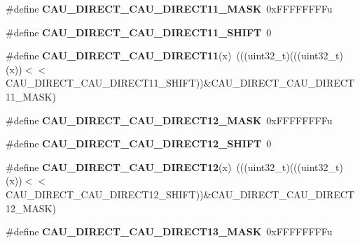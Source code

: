\begin{DoxyCompactItemize}
\item 
\#define {\bfseries C\+A\+U\+\_\+\+D\+I\+R\+E\+C\+T\+\_\+\+C\+A\+U\+\_\+\+D\+I\+R\+E\+C\+T11\+\_\+\+M\+A\+SK}~0x\+F\+F\+F\+F\+F\+F\+F\+Fu\hypertarget{group__CAU__Register__Masks_gaf2b9a81af0187f3bb946b6d0a371a05f}{}\label{group__CAU__Register__Masks_gaf2b9a81af0187f3bb946b6d0a371a05f}

\item 
\#define {\bfseries C\+A\+U\+\_\+\+D\+I\+R\+E\+C\+T\+\_\+\+C\+A\+U\+\_\+\+D\+I\+R\+E\+C\+T11\+\_\+\+S\+H\+I\+FT}~0\hypertarget{group__CAU__Register__Masks_ga5a79ec46736566014503f1858c92f19e}{}\label{group__CAU__Register__Masks_ga5a79ec46736566014503f1858c92f19e}

\item 
\#define {\bfseries C\+A\+U\+\_\+\+D\+I\+R\+E\+C\+T\+\_\+\+C\+A\+U\+\_\+\+D\+I\+R\+E\+C\+T11}(x)~(((uint32\+\_\+t)(((uint32\+\_\+t)(x))$<$$<$C\+A\+U\+\_\+\+D\+I\+R\+E\+C\+T\+\_\+\+C\+A\+U\+\_\+\+D\+I\+R\+E\+C\+T11\+\_\+\+S\+H\+I\+FT))\&C\+A\+U\+\_\+\+D\+I\+R\+E\+C\+T\+\_\+\+C\+A\+U\+\_\+\+D\+I\+R\+E\+C\+T11\+\_\+\+M\+A\+SK)\hypertarget{group__CAU__Register__Masks_gae76a60c1e2729fcd978742fd44100675}{}\label{group__CAU__Register__Masks_gae76a60c1e2729fcd978742fd44100675}

\item 
\#define {\bfseries C\+A\+U\+\_\+\+D\+I\+R\+E\+C\+T\+\_\+\+C\+A\+U\+\_\+\+D\+I\+R\+E\+C\+T12\+\_\+\+M\+A\+SK}~0x\+F\+F\+F\+F\+F\+F\+F\+Fu\hypertarget{group__CAU__Register__Masks_gaa2ee16a89961959b8a4a936d5f6ce49c}{}\label{group__CAU__Register__Masks_gaa2ee16a89961959b8a4a936d5f6ce49c}

\item 
\#define {\bfseries C\+A\+U\+\_\+\+D\+I\+R\+E\+C\+T\+\_\+\+C\+A\+U\+\_\+\+D\+I\+R\+E\+C\+T12\+\_\+\+S\+H\+I\+FT}~0\hypertarget{group__CAU__Register__Masks_gaebc337b0562194197195ce07c9f4c7d0}{}\label{group__CAU__Register__Masks_gaebc337b0562194197195ce07c9f4c7d0}

\item 
\#define {\bfseries C\+A\+U\+\_\+\+D\+I\+R\+E\+C\+T\+\_\+\+C\+A\+U\+\_\+\+D\+I\+R\+E\+C\+T12}(x)~(((uint32\+\_\+t)(((uint32\+\_\+t)(x))$<$$<$C\+A\+U\+\_\+\+D\+I\+R\+E\+C\+T\+\_\+\+C\+A\+U\+\_\+\+D\+I\+R\+E\+C\+T12\+\_\+\+S\+H\+I\+FT))\&C\+A\+U\+\_\+\+D\+I\+R\+E\+C\+T\+\_\+\+C\+A\+U\+\_\+\+D\+I\+R\+E\+C\+T12\+\_\+\+M\+A\+SK)\hypertarget{group__CAU__Register__Masks_gac4ca5dade23d4243ac71ae0d9ec57d43}{}\label{group__CAU__Register__Masks_gac4ca5dade23d4243ac71ae0d9ec57d43}

\item 
\#define {\bfseries C\+A\+U\+\_\+\+D\+I\+R\+E\+C\+T\+\_\+\+C\+A\+U\+\_\+\+D\+I\+R\+E\+C\+T13\+\_\+\+M\+A\+SK}~0x\+F\+F\+F\+F\+F\+F\+F\+Fu\hypertarget{group__CAU__Register__Masks_ga5735753e1d7d46e22b92d806218045b2}{}\label{group__CAU__Register__Masks_ga5735753e1d7d46e22b92d806218045b2}


\end{DoxyCompactItemize}

